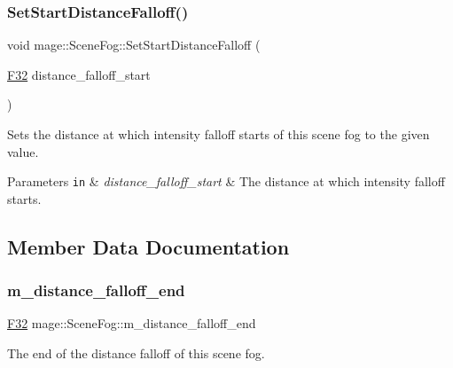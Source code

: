 \subsubsection{\texorpdfstring{Set\+Start\+Distance\+Falloff()}{SetStartDistanceFalloff()}}
{\footnotesize\ttfamily void mage\+::\+Scene\+Fog\+::\+Set\+Start\+Distance\+Falloff (\begin{DoxyParamCaption}\item[{\hyperlink{namespacemage_aa97e833b45f06d60a0a9c4fc22ae02c0}{F32}}]{distance\+\_\+falloff\+\_\+start }\end{DoxyParamCaption})\hspace{0.3cm}{\ttfamily [noexcept]}}

Sets the distance at which intensity falloff starts of this scene fog to the given value.


\begin{DoxyParams}[1]{Parameters}
\mbox{\tt in}  & {\em distance\+\_\+falloff\+\_\+start} & The distance at which intensity falloff starts. \\
\hline
\end{DoxyParams}


\subsection{Member Data Documentation}
\hypertarget{structmage_1_1_scene_fog_a8c17e984295aacba9f4226527f92e275}{}\label{structmage_1_1_scene_fog_a8c17e984295aacba9f4226527f92e275} 
\subsubsection{\texorpdfstring{m\+\_\+distance\+\_\+falloff\+\_\+end}{m\_distance\_falloff\_end}}
{\footnotesize\ttfamily \hyperlink{namespacemage_aa97e833b45f06d60a0a9c4fc22ae02c0}{F32} mage\+::\+Scene\+Fog\+::m\+\_\+distance\+\_\+falloff\+\_\+end\hspace{0.3cm}{\ttfamily [private]}}

The end of the distance falloff of this scene fog. \hypertarget{structmage_1_1_scene_fog_abe65f4142e63d52ce8894eefcae623bc}{}\label{structmage_1_1_scene_fog_abe65f4142e63d52ce8894eefcae623bc} 
